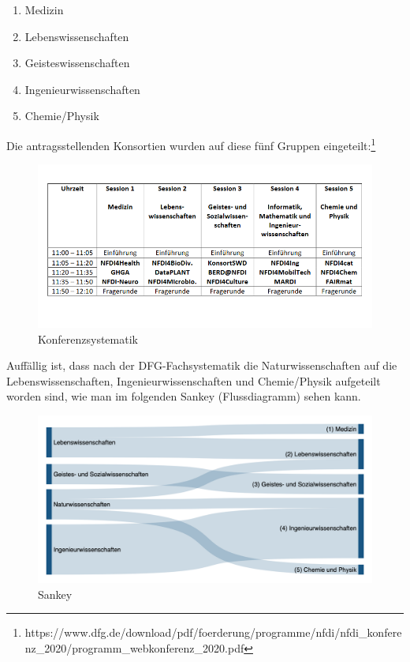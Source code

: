 \documentclass[11pt]{article}
\providecommand{\tightlist}{%
      \setlength{\itemsep}{0pt}\setlength{\parskip}{0pt}}
\begin{document}
\begin{enumerate}
\def\labelenumi{\arabic{enumi}.}
\tightlist
\item
  Medizin
\item
  Lebenswissenschaften
\item
  Geisteswissenschaften
\item
  Ingenieurwissenschaften
\item
  Chemie/Physik
\end{enumerate}

Die antragsstellenden Konsortien wurden auf diese fünf Gruppen
eingeteilt:\footnote{https://www.dfg.de/download/pdf/foerderung/programme/nfdi/nfdi\_konferenz\_2020/programm\_webkonferenz\_2020.pdf}

\begin{figure}
\centering
\includegraphics{img/nfdi-konferenzsystematik.png}
\caption{Konferenzsystematik}
\end{figure}

Auffällig ist, dass nach der DFG-Fachsystematik die Naturwissenschaften
auf die Lebenswissenschaften, Ingenieurwissenschaften und Chemie/Physik
aufgeteilt worden sind, wie man im folgenden Sankey (Flussdiagramm)
sehen kann.

\begin{figure}
\centering
\includegraphics{img/dfg-nfdi-sankey.png}
\caption{Sankey}
\end{figure}
\end{document}
